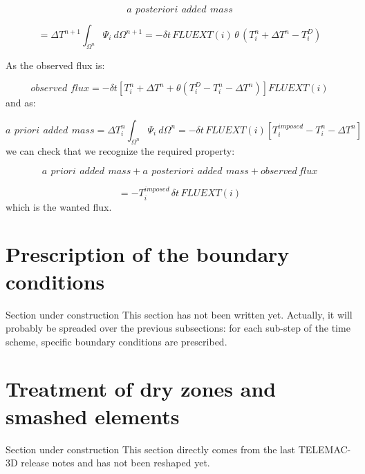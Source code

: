 \begin{equation}
a~\,posteriori~\,added\,~mass
\end{equation}
%

\begin{equation}
=\Delta T^{n+1}\int_{\Omega^{n}}\Psi_{i}~d\Omega^{n+1}=-\delta
t\,FLUEXT(i)\,\theta\,(T_{i}^{n}+\Delta T^{n}-T_{i}^{D})
\end{equation}


As the observed flux is:%

\begin{equation}
observed\,\,flux=-\delta t\left[  T_{i}^{n}+\Delta T^{n}+\theta(T_{i}%
^{D}-T_{i}^{n}-\Delta T^{n})\right]  FLUEXT(i)
\end{equation}
and as:%

\begin{equation}
a~\,priori\,~added~\,mass=\Delta T_{i}^{n}\int_{\Omega^{n}}\Psi_{i}~d\Omega
^{n}=-\delta t\,FLUEXT(i)\left[  T_{i}^{imposed}-T_{i}^{n}-\Delta
T^{n}\right]
\end{equation}
we can check that we recognize the required property:%

\begin{equation}
a~\,priori\,~added\,~mass+a~\,posteriori\,~added\,~mass+observed\,flux
\end{equation}
%

\begin{equation}
=-T_{i}^{imposed}\,\delta t\,FLUEXT(i)
\end{equation}
which is the wanted flux.

\section{Prescription of the boundary conditions}

\begin{WarningBlock}{Section under construction}
This section has not been written yet. Actually, it will probably be
spreaded over the previous subsections: for each sub-step of the time scheme,
specific boundary conditions are prescribed.
\end{WarningBlock}

\section{\label{bancs decouvrants 3D}Treatment of dry zones and smashed elements}

\begin{WarningBlock}{Section under construction}
This section directly comes from the last TELEMAC-3D release notes and has not been
reshaped yet.
\end{WarningBlock}

